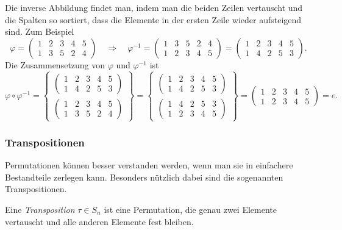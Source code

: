 Die inverse Abbildung findet man, indem man die beiden Zeilen vertauscht
und die Spalten so sortiert, dass die Elemente in der ersten Zeile
wieder aufsteigend sind.
Zum Beispiel
\[
\varphi
=
\begin{pmatrix}
1&2&3&4&5\\
1&3&5&2&4
\end{pmatrix}
\quad\Rightarrow\quad
\varphi^{-1}
=
\begin{pmatrix}
1&3&5&2&4\\
1&2&3&4&5
\end{pmatrix}
=
\begin{pmatrix}
1&2&3&4&5\\
1&4&2&5&3
\end{pmatrix}.
\]
Die Zusammensetzung von $\varphi$ und $\varphi^{-1}$ ist
\[
\varphi\circ\varphi^{-1}
=
\left\{
\begin{array}{c}
\displaystyle
\begin{pmatrix}
1&2&3&4&5\\
1&4&2&5&3
\end{pmatrix}
\\
\displaystyle
\begin{pmatrix}
1&2&3&4&5\\
1&3&5&2&4
\end{pmatrix}
\end{array}
\right\}
=
\left\{
\begin{array}{c}
\displaystyle
\begin{pmatrix}
1&2&3&4&5\\
1&4&2&5&3
\end{pmatrix}
\\
\displaystyle
\begin{pmatrix}
1&4&2&5&3\\
1&2&3&4&5
\end{pmatrix}
\end{array}
\right\}
=
\begin{pmatrix}
1&2&3&4&5\\
1&2&3&4&5
\end{pmatrix}
=
e.
\]

%
%
\subsubsection{Transpositionen}
Permutationen können besser verstanden werden, wenn man sie in einfachere 
Bestandteile zerlegen kann.
Besonders nützlich dabei sind die sogenannten Transpositionen.

\begin{definition}
Eine {\em Transposition} $\tau\in S_n$ ist eine Permutation, die genau
zwei Elemente vertauscht und alle anderen Elemente fest bleiben.
%
\end{definition}

